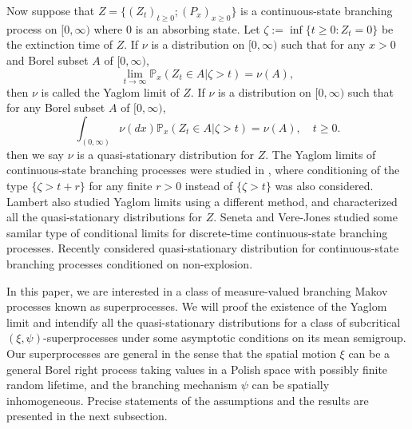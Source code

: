 \documentclass[12pt,a4paper]{amsart}
\numberwithin{equation}{section}
\theoremstyle{plain}
\theoremstyle{definition}
\theoremstyle{remark}
\begin{document}
	Now suppose that $Z =\{(Z_t)_{t \geq 0}; (P_x)_{x\geq 0}\}$  is a  continuous-state branching process on $[0,\infty)$ where $0$ is an absorbing state.  Let $\zeta:=\inf\{t\geq 0: Z_t=0\}$ be the extinction time of $Z$.
	If $\nu$ is a distribution on $[0,\infty)$ such that for any $x>0$ and Borel subset $A$ of $[0,\infty)$,
\[
	\lim_{t\rightarrow\infty}\mathbb P_x(Z_t\in A\big|\zeta>t)=\nu(A),
\]
then $\nu$ is called the Yaglom limit of $Z$.
	If $\nu$ is a distribution on $[0,\infty)$ such that for any Borel subset $A$ of $[0,\infty)$, 
\[ 
	\int_{(0,\infty)} \nu(dx)\mathbb P_x (Z_t \in A | \zeta > t) = \nu (A), \quad t\geq 0.
\] 
	then we say $\nu$ is a quasi-stationary distribution for $Z$.
	The Yaglom limits of continuous-state branching processes were studied in \cite{Li00}, where conditioning of the type $\{\zeta>t+r\}$ for any finite $r>0$ instead of $\{\zeta>t\}$ was also considered.
	Lambert \cite{Lambert2007Quasi-stationary} also studied Yaglom limits using a different method, and characterized all the quasi-stationary distributions  for $Z$.  
	Seneta and Vere-Jones \cite{SenetaVere-Jones1968On} studied some samilar type of conditional limits for discrete-time continuous-state branching processes.
	Recently \cite{Labbe2013Quasi-stationary} considered quasi-stationary distribution for continuous-state branching processes conditioned on non-explosion.


	In this paper, we are interested in a class of measure-valued branching Makov processes known as superprocesses. 
	We will proof the existence of the Yaglom limit and intendify all the quasi-stationary distributions for a class of subcritical $(\xi, \psi)$-superprocesses under some asymptotic conditions on its mean semigroup. 
	Our superprocesses are general in the sense that the spatial motion $\xi$ can be a general Borel right process taking values in a Polish space with possibly finite random lifetime, and the branching mechanism $\psi$ can be spatially inhomogeneous.
	Precise statements of the assumptions and the results are presented in the next subsection. 
	
\end{document}
